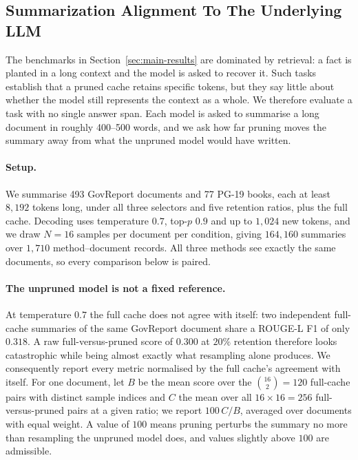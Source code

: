 \subsection{Summarization Alignment To The Underlying LLM}
\label{sec:summarization-alignment}

The benchmarks in Section~\ref{sec:main-results} are dominated by retrieval: a fact is planted in a
long context and the model is asked to recover it. Such tasks establish that a pruned cache retains
specific tokens, but they say little about whether the model still represents the context as a
whole. We therefore evaluate a task with no single answer span. Each model is asked to summarise a
long document in roughly 400--500 words, and we ask how far pruning moves the summary away from what
the unpruned model would have written.

\paragraph{Setup.} We summarise 493 GovReport documents and 77 PG-19 books, each at least $8{,}192$
tokens long, under all three selectors and five retention ratios, plus the full cache. Decoding uses
temperature $0.7$, top-$p$ $0.9$ and up to $1{,}024$ new tokens, and we draw $N = 16$ samples per
document per condition, giving $164{,}160$ summaries over $1{,}710$ method--document records. All
three methods see exactly the same documents, so every comparison below is paired.

\paragraph{The unpruned model is not a fixed reference.} At temperature $0.7$ the full cache does not
agree with itself: two independent full-cache summaries of the same GovReport document share a
ROUGE-L F1 of only $0.318$. A raw full-versus-pruned score of $0.300$ at $20\%$ retention
therefore looks catastrophic while being almost exactly what resampling alone produces. We
consequently report every metric normalised by the full cache's agreement with itself. For one
document, let $B$ be the mean score over the $\binom{16}{2} = 120$ full-cache pairs with distinct
sample indices and $C$ the mean over all $16 \times 16 = 256$ full-versus-pruned pairs at a given
ratio; we report $100\,C/B$, averaged over documents with equal weight. A value of $100$ means
pruning perturbs the summary no more than resampling the unpruned model does, and values slightly
above $100$ are admissible.

